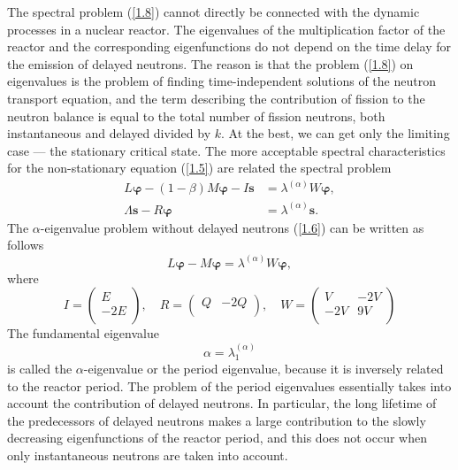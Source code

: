 \documentclass[authoryear]{elsarticle}
\begin{document}
The spectral problem (\ref{1.8}) cannot directly be connected with the
dynamic processes in a nuclear reactor. The eigenvalues of the multiplication factor of the reactor and the corresponding eigenfunctions do not depend on the time delay for the emission of delayed neutrons. 
The reason is that the problem (\ref{1.8}) on eigenvalues is the problem of finding time-independent solutions of the neutron transport equation, and the term describing the contribution of fission to the neutron balance is equal to the total number of fission neutrons, both instantaneous and delayed divided by $k$.
At the best, we can get only the limiting case --- the stationary critical state.
The more acceptable spectral characteristics for the non-stationary equation (\ref{1.5}) are related the spectral problem
\begin{equation}\label{1.9}
\begin{split}
L \bm \varphi - (1 - \beta) M \bm \varphi - I \bm s &= \lambda^{(\alpha)} W \bm \varphi, \\
\Lambda \bm s - R \bm \varphi  &= \lambda^{(\alpha)} \bm s.
\end{split}
\end{equation}
The  $\alpha$-eigenvalue problem without delayed neutrons (\ref{1.6}) can be written as follows
\begin{equation}\label{1.10}
L \bm \varphi - M \bm \varphi = \lambda^{(\alpha)} W \bm \varphi,
\end{equation}
where
\[
I = \begin{pmatrix}
E \\
-2E \\
\end{pmatrix},
\quad
R = \begin{pmatrix}
Q & -2Q \\
\end{pmatrix},
\quad
W = \begin{pmatrix}
V & -2V \\
-2V & 9V \\
\end{pmatrix}
\]
The fundamental eigenvalue
\[
 \alpha = \lambda^{(\alpha)}_1
\]
is called \citep{bell1970} the $\alpha$-eigenvalue or the period eigenvalue, because it is inversely related to the reactor period.
The problem of the period eigenvalues essentially takes into account the contribution of delayed neutrons.
In particular, the long lifetime of the predecessors of delayed neutrons makes a large contribution to the slowly decreasing eigenfunctions of the reactor period, and this does not occur when only instantaneous neutrons are taken into account.
\end{document}
